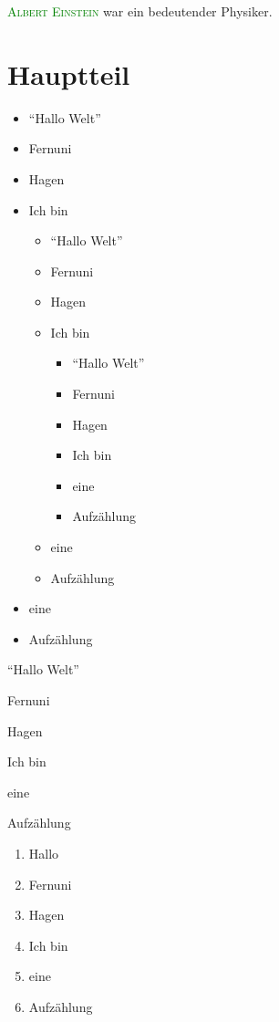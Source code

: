 \documentclass[12pt,ngerman,parskip=full]{scrreprt}
\newcommand{\person}[1]{\textsc{\textcolor{green}{#1}}}
\begin{document}
\person{Albert Einstein} war ein bedeutender Physiker.

\chapter{Hauptteil}\label{cha:hauptteil}

\blindtext[2]  

\newpage

\begin{itemize}
	\item \enquote{Hallo Welt}
	\item Fernuni
	\item Hagen
	\item Ich bin
	
	\begin{itemize}
	\item \enquote{Hallo Welt}
	\item Fernuni
	\item Hagen
	\item Ich bin
	
	\begin{itemize}
	\item \enquote{Hallo Welt}
	\item Fernuni
	\item Hagen
	\item Ich bin
	\item eine 
	\item Aufzählung
\end{itemize}

	\item eine 
	\item Aufzählung
\end{itemize}
	
	
	\item eine 
	\item Aufzählung
\end{itemize}

\begin{compactitem}
	\item \enquote{Hallo Welt}
	\item Fernuni
	\item Hagen
	\item Ich bin
	\item eine 
	\item Aufzählung
\end{compactitem}

\begin{enumerate}
	\item Hallo 
	\item Fernuni
	\item Hagen
	\item Ich bin
	\item eine 
	\item Aufzählung
\end{enumerate}
\end{document}
